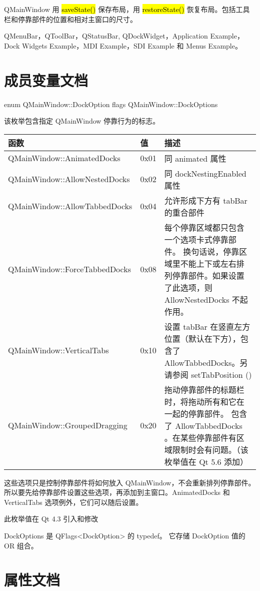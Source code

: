 QMainWindow 用 \hl{saveState()} 保存布局，用 \hl{restoreState()} 恢复布局。包括工具栏和停靠部件的位置和相对主窗口的尺寸。

\begin{notice}[另请参阅]
QMenuBar，QToolBar，QStatusBar, QDockWidget，Application Example，
Dock Widgets Example，MDI Example，SDI Example 和 Menus Example。
\end{notice}

\section{成员变量文档}

enum QMainWindow::DockOption flags QMainWindow::DockOptions

该枚举包含指定 QMainWindow 停靠行为的标志。

\begin{tabular}{|l|l|m{25em}|}
\hline
函数	& 值	&描述 \\ 
\hline
QMainWindow::AnimatedDocks&	0x01	&同 animated 属性 \\
\hline
QMainWindow::AllowNestedDocks	&0x02&	同 dockNestingEnabled 属性 \\ 
\hline
QMainWindow::AllowTabbedDocks	&0x04	&允许形成下方有 tabBar 的重合部件 \\ 
\hline
QMainWindow::ForceTabbedDocks	&0x08&	每个停靠区域都只包含一个选项卡式停靠部件。
换句话说，停靠区域里不能上下或左右排列停靠部件。如果设置了此选项，则 AllowNestedDocks 不起作用。 \\
\hline
QMainWindow::VerticalTabs	&0x10	&设置 tabBar 在竖直左方位置（默认在下方），包含了 AllowTabbedDocks。另请参阅 setTabPosition () \\ 
\hline
QMainWindow::GroupedDragging	&0x20	&拖动停靠部件的标题栏时，将拖动所有和它在一起的停靠部件。
包含了 AllowTabbedDocks 。在某些停靠部件有区域限制时会有问题。（该枚举值在 Qt 5.6 添加） \\ 
\hline
\end{tabular}

这些选项只是控制停靠部件将如何放入 QMainWindow，不会重新排列停靠部件。
所以要先给停靠部件设置这些选项，再添加到主窗口。AnimatedDocks 和 VerticalTabs 选项例外，它们可以随后设置。

此枚举值在 Qt 4.3 引入和修改

DockOptions 是 QFlags<DockOption> 的 typedef。
它存储 DockOption 值的 OR 组合。

\section{属性文档}

